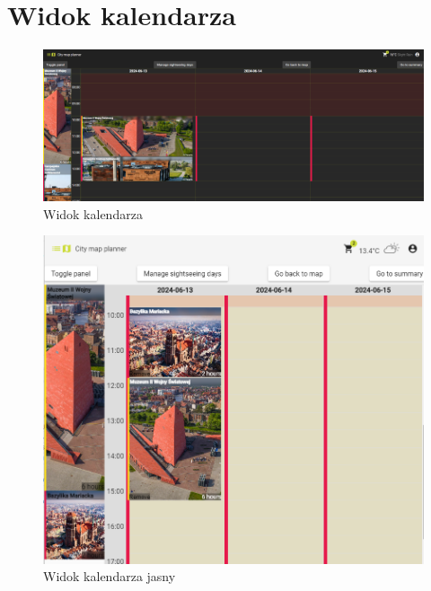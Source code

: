 \section{Widok kalendarza}
\label{sec:atrakcjawidok}
\begin{figure}[H]
        \centering
        \includegraphics[width=1\textwidth]{attachments/kalendarz}
        \caption{Widok kalendarza}
        \label{fig:kalendarz}
\end{figure}
\begin{figure}[H]
    \centering
    \includegraphics[width=1\textwidth]{attachments/kalendarz-light}
    \caption{Widok kalendarza jasny}
    \label{fig:kalendarz-light}
\end{figure}
